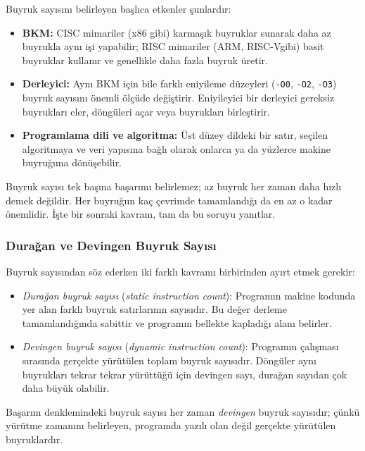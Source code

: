 Buyruk sayısını belirleyen başlıca etkenler şunlardır:
\begin{itemize}
    \item \textbf{BKM:} CISC mimariler (x86 gibi) karmaşık buyruklar sunarak daha az buyrukla aynı işi yapabilir; RISC mimariler (ARM, RISC-V\@ gibi) basit buyruklar kullanır ve genellikle daha fazla buyruk üretir.
    \item \textbf{Derleyici:} Aynı BKM için bile farklı eniyileme düzeyleri (\texttt{-O0}, \texttt{-O2}, \texttt{-O3}) buyruk sayısını önemli ölçüde değiştirir. Eniyileyici bir derleyici gereksiz buyrukları eler, döngüleri açar veya buyrukları birleştirir.
    \item \textbf{Programlama dili ve algoritma:} Üst düzey dildeki bir satır, seçilen algoritmaya ve veri yapısına bağlı olarak onlarca ya da yüzlerce makine buyruğuna dönüşebilir.
\end{itemize}

Buyruk sayısı tek başına başarımı belirlemez; az buyruk her zaman daha hızlı demek değildir. Her buyruğun kaç çevrimde tamamlandığı da en az o kadar önemlidir. İşte bir sonraki kavram, tam da bu soruyu yanıtlar.

\subsubsection{Durağan ve Devingen Buyruk Sayısı}
\label{subsec:duragan-devingen}

Buyruk sayısından söz ederken iki farklı kavramı birbirinden ayırt etmek gerekir:

\begin{itemize}
    \item \emph{Durağan buyruk sayısı} (\textit{static instruction count}): Programın makine kodunda yer alan farklı buyruk satırlarının sayısıdır. Bu değer derleme tamamlandığında sabittir ve programın bellekte kapladığı alanı belirler.
    \item \emph{Devingen buyruk sayısı} (\textit{dynamic instruction count}): Programın çalışması sırasında gerçekte yürütülen toplam buyruk sayısıdır. Döngüler aynı buyrukları tekrar tekrar yürüttüğü için devingen sayı, durağan sayıdan çok daha büyük olabilir.
\end{itemize}

Başarım denklemindeki buyruk sayısı her zaman \emph{devingen} buyruk sayısıdır; çünkü yürütme zamanını belirleyen, programda yazılı olan değil gerçekte yürütülen buyruklardır.


